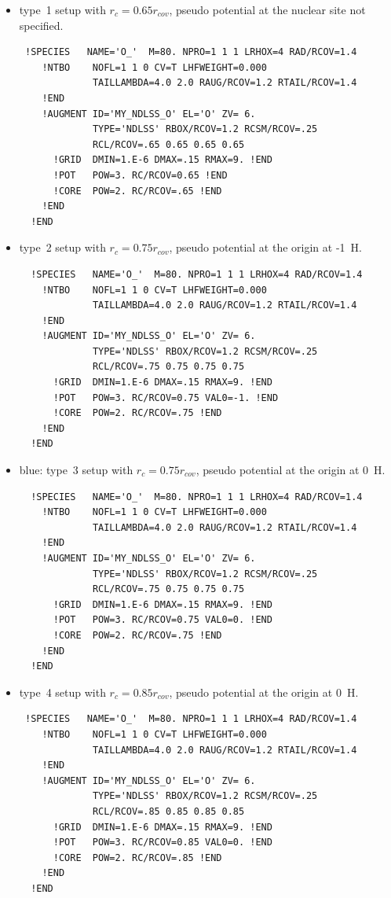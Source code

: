 \documentclass[11pt,a4paper]{report}
\begin{document}
\begin{itemize}
\item type~1 setup with $r_c=0.65 r_{cov}$, pseudo potential at the
  nuclear site not specified.
{\tiny\begin{verbatim}
 !SPECIES   NAME='O_'  M=80. NPRO=1 1 1 LRHOX=4 RAD/RCOV=1.4
    !NTBO    NOFL=1 1 0 CV=T LHFWEIGHT=0.000
             TAILLAMBDA=4.0 2.0 RAUG/RCOV=1.2 RTAIL/RCOV=1.4 
    !END 
    !AUGMENT ID='MY_NDLSS_O' EL='O' ZV= 6.
             TYPE='NDLSS' RBOX/RCOV=1.2 RCSM/RCOV=.25
             RCL/RCOV=.65 0.65 0.65 0.65
      !GRID  DMIN=1.E-6 DMAX=.15 RMAX=9. !END
      !POT   POW=3. RC/RCOV=0.65 !END
      !CORE  POW=2. RC/RCOV=.65 !END
    !END
  !END
\end{verbatim}}
\item type~2 setup with $r_c=0.75 r_{cov}$, pseudo potential at the
  origin at -1~H.
{\tiny\begin{verbatim}
  !SPECIES   NAME='O_'  M=80. NPRO=1 1 1 LRHOX=4 RAD/RCOV=1.4
    !NTBO    NOFL=1 1 0 CV=T LHFWEIGHT=0.000
             TAILLAMBDA=4.0 2.0 RAUG/RCOV=1.2 RTAIL/RCOV=1.4 
    !END 
    !AUGMENT ID='MY_NDLSS_O' EL='O' ZV= 6.
             TYPE='NDLSS' RBOX/RCOV=1.2 RCSM/RCOV=.25
             RCL/RCOV=.75 0.75 0.75 0.75
      !GRID  DMIN=1.E-6 DMAX=.15 RMAX=9. !END
      !POT   POW=3. RC/RCOV=0.75 VAL0=-1. !END
      !CORE  POW=2. RC/RCOV=.75 !END
    !END
  !END
\end{verbatim}}
\item blue: type~3 setup with $r_c=0.75 r_{cov}$, pseudo potential at the
  origin at 0~H.
{\tiny\begin{verbatim}
  !SPECIES   NAME='O_'  M=80. NPRO=1 1 1 LRHOX=4 RAD/RCOV=1.4
    !NTBO    NOFL=1 1 0 CV=T LHFWEIGHT=0.000
             TAILLAMBDA=4.0 2.0 RAUG/RCOV=1.2 RTAIL/RCOV=1.4 
    !END 
    !AUGMENT ID='MY_NDLSS_O' EL='O' ZV= 6.
             TYPE='NDLSS' RBOX/RCOV=1.2 RCSM/RCOV=.25
             RCL/RCOV=.75 0.75 0.75 0.75
      !GRID  DMIN=1.E-6 DMAX=.15 RMAX=9. !END
      !POT   POW=3. RC/RCOV=0.75 VAL0=0. !END
      !CORE  POW=2. RC/RCOV=.75 !END
    !END
  !END
\end{verbatim}}
\item type~4 setup with $r_c=0.85 r_{cov}$, pseudo potential at the
  origin at 0~H.
{\tiny\begin{verbatim}
 !SPECIES   NAME='O_'  M=80. NPRO=1 1 1 LRHOX=4 RAD/RCOV=1.4
    !NTBO    NOFL=1 1 0 CV=T LHFWEIGHT=0.000
             TAILLAMBDA=4.0 2.0 RAUG/RCOV=1.2 RTAIL/RCOV=1.4 
    !END 
    !AUGMENT ID='MY_NDLSS_O' EL='O' ZV= 6.
             TYPE='NDLSS' RBOX/RCOV=1.2 RCSM/RCOV=.25
             RCL/RCOV=.85 0.85 0.85 0.85
      !GRID  DMIN=1.E-6 DMAX=.15 RMAX=9. !END
      !POT   POW=3. RC/RCOV=0.85 VAL0=0. !END
      !CORE  POW=2. RC/RCOV=.85 !END
    !END
  !END
\end{verbatim}}
\end{itemize}
\end{document}
